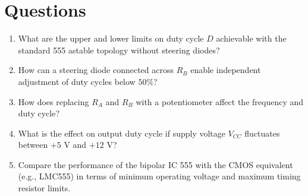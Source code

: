 \section{Questions}
\begin{enumerate}
	\item What are the upper and lower limits on duty cycle $D$ achievable with the standard 555 astable topology without steering diodes?
\item How can a steering diode connected across $R_B$ enable independent adjustment of duty cycles below $50\%$?
\item How does replacing $R_A$ and $R_B$ with a potentiometer affect the frequency and duty cycle?
\item What is the effect on output duty cycle if supply voltage $V_{CC}$ fluctuates between $+5\text{ V}$ and $+12\text{ V}$?
\item Compare the performance of the bipolar IC 555 with the CMOS equivalent (e.g., LMC555) in terms of minimum operating voltage and maximum timing resistor limits.
\end{enumerate}